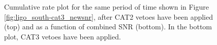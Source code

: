 \begin{figure}[p]
\center
{}
\label{fig:ligo_south-cat2_and_snr}
\caption{Cumulative rate plot for the same period of time shown in Figure \ref{fig:ligo_south-cat3_newsnr}, after CAT2 vetoes have been applied (top) and as a function of combined \ac{SNR} (bottom). In the bottom plot, CAT3 vetoes have been applied.}
\end{figure}


